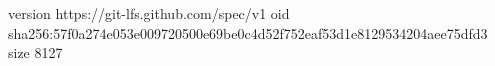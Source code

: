 version https://git-lfs.github.com/spec/v1
oid sha256:57f0a274e053e009720500e69be0c4d52f752eaf53d1e8129534204aee75dfd3
size 8127

